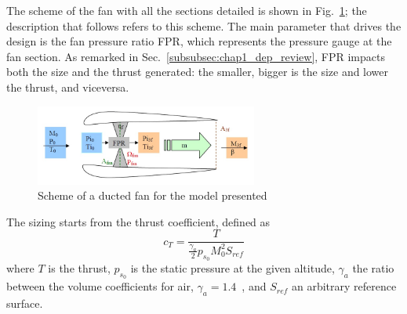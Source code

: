 The scheme of the fan with all the sections detailed is shown in Fig.~\ref{fig:ducted_fan_scheme}; the description that follows refers to this scheme. 
The main parameter that drives the design is the fan pressure ratio FPR, which represents the pressure gauge at the fan section. 
As remarked in Sec.~\ref{subsubsec:chap1_dep_review}, FPR impacts both the size and the thrust generated: the smaller, bigger is the size and lower the thrust, and viceversa. 
\begin{figure}[h]
	\centering
	\includegraphics[keepaspectratio, width=0.65\textwidth]{images/chap3/ducted_fan_scheme.jpg}
	\caption{Scheme of a ducted fan for the model presented} 
	\label{fig:ducted_fan_scheme}
\end{figure}
The sizing starts from the thrust coefficient, defined as
\begin{equation}
	\label{eq:thrust_coeff}
	c_T = \frac{T}{\frac{\gamma_a}{2}p_{s_{0}}M_{0}^2S_{ref}}
\end{equation}	
where $T$ is the thrust, $p_{s_{0}}$ is the static pressure at the given altitude, $\gamma_a$ the ratio between the volume coefficients for air, $\gamma_a=1.4$~\cite{bib:fermi}, and $S_{ref}$ an arbitrary reference surface. 

